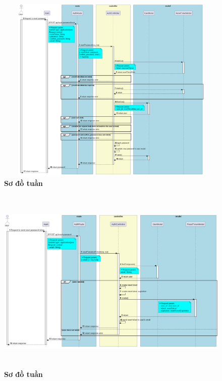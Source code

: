 \begin{figure}[H]
  \centering
  \includegraphics[width=16cm,height=9cm]{Images/server/sequence/server/resetPassword.png}
  \caption[Sơ đồ tuần tự ]{\bfseries \fontsize{12pt}{0pt}
  \selectfont Sơ đồ tuần }
  \label{hinh21} %
\end{figure}

\begin{figure}[H]
  \centering
  \includegraphics[width=16cm,height=9cm]{Images/server/sequence/server/resetPasswordToken.png}
  \caption[Sơ đồ tuần tự ]{\bfseries \fontsize{12pt}{0pt}
  \selectfont Sơ đồ tuần }
  \label{hinh21} %
\end{figure}

